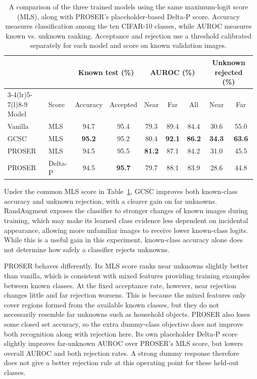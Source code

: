\documentclass{article}
\newcommand{\best}[1]{\textbf{#1}}
\begin{document}
\begin{table}[H]
\caption{A comparison of the three trained models using the same maximum-logit score (MLS), along with PROSER's placeholder-based Delta-P score. Accuracy measures classification among the ten CIFAR-10 classes, while AUROC measures known vs. unknown ranking. Acceptance and rejection use a threshold calibrated separately for each model and score on known validation images.}
\label{tab:osrmodels}\centering\scriptsize\setlength{\tabcolsep}{3pt}
\begin{tabular}{@{}ll*{7}{c}@{}}
\toprule
& & \multicolumn{2}{c}{Known test (\%)} & \multicolumn{3}{c}{AUROC (\%)} & \multicolumn{2}{c}{Unknown rejected (\%)}\\
\cmidrule(lr){3-4}\cmidrule(lr){5-7}\cmidrule(l){8-9}
Model & Score & Accuracy & Accepted & Near & Far & All & Near & Far\\
\midrule
Vanilla & MLS & 94.7 & 95.4 & 79.3 & 89.4 & 84.4 & 30.6 & 55.0\\
GCSC & MLS & \best{95.2} & 95.2 & 80.4 & \best{92.1} & \best{86.2} & \best{34.3} & \best{63.6}\\
PROSER & MLS & 94.5 & 95.5 & \best{81.2} & 87.1 & 84.2 & 31.0 & 45.5\\
PROSER & Delta-P & 94.5 & \best{95.7} & 79.7 & 88.1 & 83.9 & 28.6 & 44.8\\
\bottomrule
\end{tabular}
\end{table}

Under the common MLS score in Table~\ref{tab:osrmodels}, GCSC improves both known-class accuracy and unknown rejection, with a clearer gain on far unknowns. RandAugment exposes the classifier to stronger changes of known images during training, which may make its learned class evidence less dependent on incidental appearance, allowing more unfamiliar images to receive lower known-class logits. While this is a useful gain in this experiment, known-class accuracy alone does not determine how safely a classifier rejects unknowns.

PROSER behaves differently. Its MLS score ranks near unknowns slightly better than vanilla, which is consistent with mixed features providing training examples between known classes. At the fixed acceptance rate, however, near rejection changes little and far rejection worsens. This is because the mixed features only cover regions formed from the available known classes, but they do not necessarily resemble far unknowns such as household objects. PROSER also loses some closed set accuracy, so the extra dummy-class objective does not improve both recognition along with rejection here. Its own placeholder Delta-P score slightly improves far-unknown AUROC over PROSER's MLS score, but lowers overall AUROC and both rejection rates. A strong dummy response therefore does not give a better rejection rule at this operating point for these held-out classes.
\end{document}
